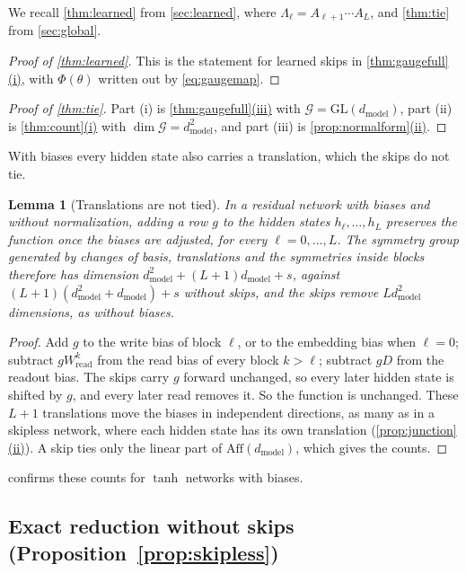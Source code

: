 \documentclass[10pt]{article}
\newtheorem{lemma}[theorem]{Lemma}
\theoremstyle{definition}
\theoremstyle{remark}
\newcommand{\Wread}{W_{\mathrm{read}}}
\newcommand{\dm}{d_{\mathrm{model}}}
\newcommand{\GL}{\mathrm{GL}}
\newcommand{\Aff}{\mathrm{Aff}}
\newcommand{\G}{\mathcal{G}}
\DeclareRobustCommand{\cpref}[2]{\hyperref[#1:#2]{\cref*{#1}(#2)}}
\begin{document}
We recall \cref{thm:learned} from \cref{sec:learned}, where $\Lambda_\ell = A_{\ell+1}\cdots A_L$, and \cref{thm:tie} from \cref{sec:global}.
\thmLearned*

\begin{proof}[Proof of \cref{thm:learned}]
This is the statement for learned skips in \cpref{thm:gaugefull}{i}, with $\Phi(\theta)$ written out by \cref{eq:gaugemap}.
\end{proof}

\thmTie*

\begin{proof}[Proof of \cref{thm:tie}]
Part (i) is \cpref{thm:gaugefull}{iii} with $\G = \GL(\dm)$, part (ii) is \cpref{thm:count}{i} with $\dim\G = \dm^2$, and part (iii) is \cpref{prop:normalform}{ii}.
\end{proof}

With biases every hidden state also carries a translation, which the skips do not tie.

\begin{lemma}[Translations are not tied]\label{lem:translations}
In a residual network with biases and without normalization, adding a row $g$ to the hidden states $h_\ell, \dots, h_L$ preserves the function once the biases are adjusted, for every $\ell = 0, \dots, L$. The symmetry group generated by changes of basis, translations and the symmetries inside blocks therefore has dimension $\dm^2 + (L+1)\dm + s$, against $(L+1)(\dm^2 + \dm) + s$ without skips, and the skips remove $L\dm^2$ dimensions, as without biases.
\end{lemma}

\begin{proof}
Add $g$ to the write bias of block $\ell$, or to the embedding bias when $\ell = 0$; subtract $g\Wread^{k}$ from the read bias of every block $k > \ell$; subtract $gD$ from the readout bias. The skips carry $g$ forward unchanged, so every later hidden state is shifted by $g$, and every later read removes it. So the function is unchanged. These $L + 1$ translations move the biases in independent directions, as many as in a skipless network, where each hidden state has its own translation (\cpref{prop:junction}{ii}). A skip ties only the linear part of $\Aff(\dm)$, which gives the counts.
\end{proof}

 confirms these counts for $\tanh$ networks with biases.


\subsection{Exact reduction without skips\texorpdfstring{ (Proposition~\ref*{prop:skipless})}{}}\label{app:prf-normalform}
\end{document}
